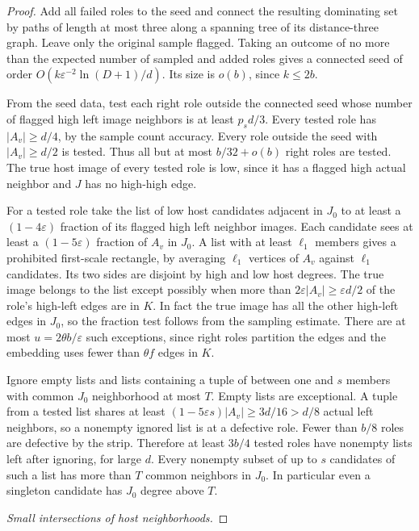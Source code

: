\documentclass[11pt]{amsart}
\theoremstyle{definition}
\theoremstyle{remark}
\numberwithin{equation}{section}
\begin{document}
\begin{proof}
Add all failed roles to the seed and connect the resulting dominating set by paths of length at most three along a spanning tree of its distance-three graph. Leave only the original sample flagged. Taking an outcome of no more than the expected number of sampled and added roles gives a connected seed of order $O(k\varepsilon^{-2}\ln(D+1)/d)$. Its size is $ o(b)$, since $ k\le2b$.

From the seed data, test each right role outside the connected seed whose number of flagged high left image neighbors is at least $p_s d/3$. Every tested role has $|A_v|\ge d/4$, by the sample count accuracy. Every role outside the seed with $|A_v|\ge d/2$ is tested. Thus all but at most $ b/32+o(b)$ right roles are tested. The true host image of every tested role is low, since it has a flagged high actual neighbor and $ J$ has no high-high edge.

For a tested role take the list of low host candidates adjacent in $J_0$ to at least a $(1-4\varepsilon)$ fraction of its flagged high left neighbor images. Each candidate sees at least a $(1-5\varepsilon)$ fraction of $ A_v $ in $ J_0$. A list with at least $\ell_1$ members gives a prohibited first-scale rectangle, by averaging $\ell_1$ vertices of $ A_v $ against $\ell_1$ candidates. Its two sides are disjoint by high and low host degrees. The true image belongs to the list except possibly when more than $2\varepsilon|A_v|\ge\varepsilon d/2$ of the role's high-left edges are in $ K $. In fact the true image has all the other high-left edges in $ J_0$, so the fraction test follows from the sampling estimate. There are at most $ u=2\theta b/\varepsilon $ such exceptions, since right roles partition the edges and the embedding uses fewer than $\theta f $ edges in $ K$.

Ignore empty lists and lists containing a tuple of between one and $s $ members with common $ J_0$ neighborhood at most $ T $. Empty lists are exceptional. A tuple from a tested list shares at least $(1-5\varepsilon s)|A_v|\ge3d/16>d/8$ actual left neighbors, so a nonempty ignored list is at a defective role. Fewer than $ b/8$ roles are defective by the strip. Therefore at least $3b/4$ tested roles have nonempty lists left after ignoring, for large $ d $. Every nonempty subset of up to $ s $ candidates of such a list has more than $ T $ common neighbors in $ J_0$. In particular even a singleton candidate has $ J_0$ degree above $ T$.

\medskip\noindent\emph{Small intersections of host neighborhoods.}


\end{proof}
\end{document}
